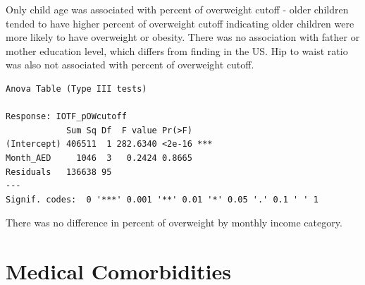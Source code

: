 \documentclass[
]{article}
\begin{document}
\FloatBarrier

Only child age was associated with percent of overweight cutoff - older
children tended to have higher percent of overweight cutoff indicating
older children were more likely to have overweight or obesity. There was
no association with father or mother education level, which differs from
finding in the US. Hip to waist ratio was also not associated with
percent of overweight cutoff.

\FloatBarrier

\begin{verbatim}
Anova Table (Type III tests)

Response: IOTF_pOWcutoff
            Sum Sq Df  F value Pr(>F)    
(Intercept) 406511  1 282.6340 <2e-16 ***
Month_AED     1046  3   0.2424 0.8665    
Residuals   136638 95                    
---
Signif. codes:  0 '***' 0.001 '**' 0.01 '*' 0.05 '.' 0.1 ' ' 1
\end{verbatim}

\FloatBarrier

There was no difference in percent of overweight by monthly income
category.

\FloatBarrier

\clearpage

\hypertarget{medical-comorbidities}{%
\section{Medical Comorbidities}\label{medical-comorbidities}}
\end{document}
